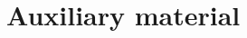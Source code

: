 \documentclass{outhesis}
\begin{document}
\clearpage

\appendix

\chapter{Auxiliary material}\label{chap:aux}
\graphicspath{{figures/app/}}



%

%


\backmatter
\end{document}

